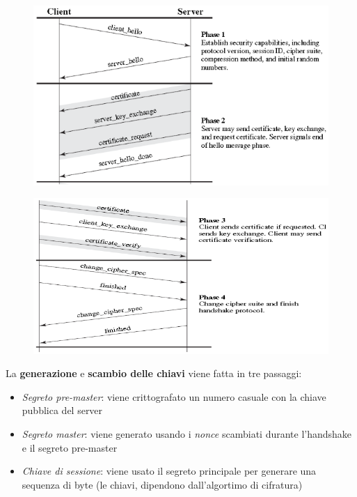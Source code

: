 \begin{figure}[H]
    \centering
    \includegraphics[width=1\linewidth]{chapters/10/images/hs1.png}
\end{figure}
\begin{figure}[H]
    \centering
    \includegraphics[width=1\linewidth]{chapters/10/images/hs2.png}
\end{figure}

\noindent La \textbf{generazione} e \textbf{scambio delle chiavi} viene fatta
in tre passaggi:
\begin{itemize}
    \item \textit{Segreto pre-master}: viene crittografato un numero casuale con la chiave pubblica del server 
    \item \textit{Segreto master}: viene generato usando i \textit{nonce} scambiati durante l'handshake e il 
    segreto pre-master 
    \item \textit{Chiave di sessione}: viene usato il segreto principale per generare 
    una sequenza di byte (le chiavi, dipendono dall'algortimo di cifratura)
\end{itemize}


